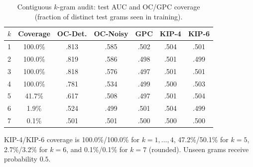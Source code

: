 \begin{table}[htbp]
\centering\small
\caption{Contiguous $k$-gram audit: test AUC and OC/GPC coverage
(fraction of distinct test grams seen in training).}
\label{tab:ngram_appendix}
\begin{tabular}{lcccccc}
\toprule
$k$ & Coverage & OC-Det. & OC-Noisy & GPC & KIP-4 & KIP-6 \\
\midrule
1 & 100.0\% & .813 & .585 & .502 & .504 & .501 \\
2 & 100.0\% & .819 & .586 & .498 & .501 & .499 \\
3 & 100.0\% & .818 & .576 & .497 & .501 & .501 \\
4 & 100.0\% & .781 & .534 & .499 & .500 & .503 \\
5 & 41.7\%  & .617 & .508 & .497 & .501 & .504 \\
6 & 1.9\%   & .524 & .499 & .501 & .504 & .499 \\
7 & 0.1\%   & .501 & .501 & .500 & .500 & .500 \\
\bottomrule
\end{tabular}
\par\smallskip
\begin{minipage}{\linewidth}
\footnotesize
KIP-4/KIP-6 coverage is 100.0\%/100.0\% for $k=1,\ldots,4$,
47.2\%/50.1\% for $k=5$, 2.7\%/3.2\% for $k=6$, and
0.1\%/0.1\% for $k=7$ (rounded).
Unseen grams receive probability $0.5$.
\end{minipage}
\end{table}
